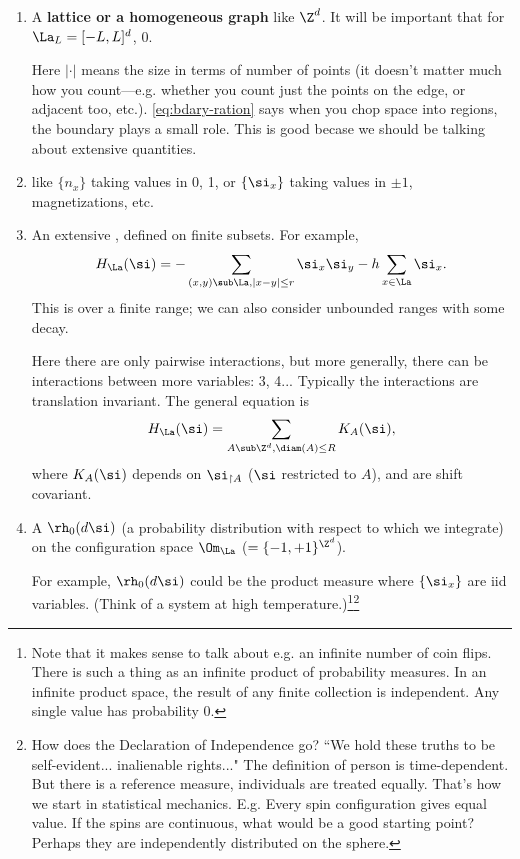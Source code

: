 \begin{enumerate}
\item
A \textbf{lattice or a homogeneous graph} like $\Z^d$. %
It will be important that for $\La_L=[-L,L]^d$, 
  0.
\eeq

Here $|\cdot|$ means the size in terms of number of points (it doesn't matter much how you count---e.g. whether you count just the points on the edge, or adjacent too, etc.). \eqref{eq:bdary-ration} says when you chop space into regions, the boundary plays a small role. This is good becase we should be talking about extensive quantities.
\item
{} like $\{n_x\}$ taking values in 0, 1, or $\{\si_x\}$ taking values in $\pm1$, magnetizations, etc.
\item
An extensive , defined on finite subsets. 
For example, 
\[
H_{\La}(\si)=-\sum_{(x,y)\sub \La, |x-y|\le r}%
\si_x\si_y - h\sum_{x\in \La} \si_x.
\]
This is over a finite range; we can also consider unbounded ranges with some decay.

Here there are only pairwise interactions, but more generally, there can be interactions between more variables: 3, 4... Typically the interactions are translation invariant. The general equation is
\[
H_{\La}(\si) = \sum_{A\sub \Z^d, \diam(A)\le R} K_A(\si),
\]
where $K_A(\si)$ depends on $\si_{\upharpoonright A}$ ($\si$ restricted to $A$), and are shift covariant.

\item
A  $\rh_0(d\si)$ (a probability distribution with respect to which we integrate) on the configuration space $\Om_\La$ ($=\{-1,+1\}^{\Z^d}$).

For example, $\rh_0(d\si)$ could be the product measure where $\{\si_x\}$ are iid variables. (Think of a system at high temperature.)\footnote{Note that it makes sense to talk about e.g. an infinite number of coin flips. There is such a thing as an infinite product of probability measures. In an infinite product space, the result of any finite collection is independent.  Any single value has probability 0.}\footnote{How does the Declaration of Independence go? ``We hold these truths to be self-evident... inalienable rights..." The definition of person is time-dependent. But there is a reference measure, individuals are treated equally. That's how we start in statistical mechanics. E.g. Every spin configuration gives equal value. If the spins are continuous, what would be a good starting point? Perhaps they are independently distributed on the sphere.}


\end{enumerate}
